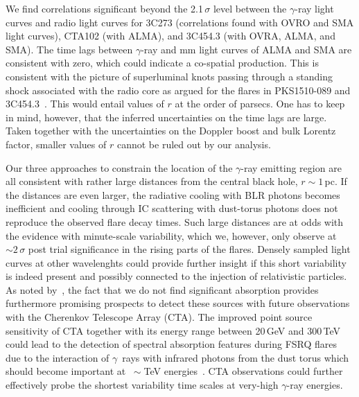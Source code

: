 \documentclass[twocolumn,linenumbers]{aastex62}
\newcommand{\Grays}{$\gamma$~rays\xspace}
\newcommand{\gray}{$\gamma$-ray\xspace}
\begin{document}
We find correlations significant beyond the 2.1\,$\sigma$ level between the \gray light curves and radio light curves for 3C273 (correlations found with OVRO and SMA light curves), CTA102 (with ALMA), and 3C454.3 (with OVRA, ALMA, and SMA). 
The time lags between \gray and mm light curves of ALMA and SMA are consistent with zero, which could indicate a co-spatial production. 
This is consistent with the picture of superluminal knots passing through a standing shock associated with the radio core as argued for the flares in PKS1510-089 and 3C454.3~\citep{2010ApJ...710L.126M,2012ApJ...758...72W,2013MNRAS.428.2418O}. 
This would entail values of $r$ at the order of parsecs. 
One has to keep in mind, however, that the inferred  uncertainties on the time lags are large. 
Taken together with the uncertainties on the Doppler boost and bulk Lorentz factor, 
smaller values of $r$ cannot be ruled out by our analysis. 

Our three approaches to constrain the location of the \gray emitting region are all consistent with rather large distances from the central black hole, $r \sim 1\,$pc. 
If the distances are even larger, the radiative cooling with BLR photons becomes inefficient and cooling through IC scattering with dust-torus photons does not reproduce the observed flare decay times. 
Such large distances are at odds with the evidence with minute-scale variability, which we, however, only observe at $\sim2\,\sigma$ post trial significance in the rising parts of the flares. 
Densely sampled light curves at other wavelenghts could provide further insight if this short variability is indeed present and possibly connected to the injection of relativistic particles.
As noted by~\citet{2018MNRAS.477.4749C}, the fact that we do not find significant absorption provides furthermore promising prospects to detect these sources with future observations with the Cherenkov Telescope Array (CTA). 
The improved point source sensitivity of CTA together with its energy range between 20\,GeV and 300\,TeV~\citep{2017arXiv170907997C} could lead to the detection of spectral absorption features during FSRQ flares due to the interaction of \Grays with infrared photons from the dust torus which should become important at $~\sim$TeV energies~\citep[see, e.g., Fig. 14 in][]{finke2016}.
CTA observations could further effectively probe the shortest variability time scales at very-high \gray energies.
\end{document}
